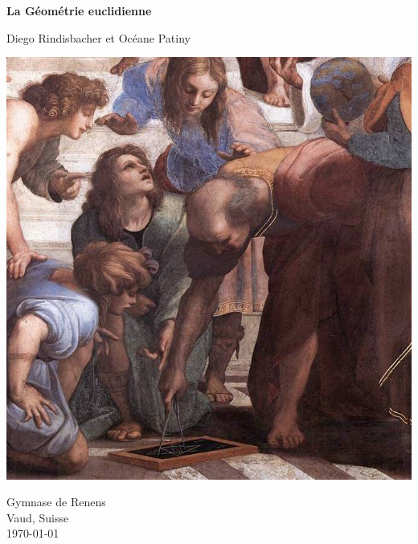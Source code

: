 \documentclass[a4paper,12pt]{article}
\begin{document}
\begin{titlepage}
    \begin{center}
        
        \Huge
        \textbf{La Géométrie euclidienne}
        
        \vspace{0.5cm}
        \large
        Diego Rindisbacher et Océane Patiny
        
        
         \vspace{3cm}
          \includegraphics[scale=2.5]{Euclide.jpg}
          
         \vspace{0.5cm}
          \small
        Gymnase de Renens\\
        Vaud, Suisse\\
        \today
    \end{center}
\end{titlepage}
\end{document}
